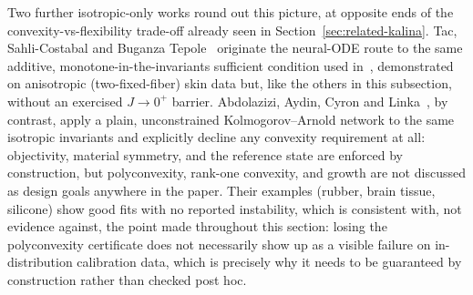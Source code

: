 \documentclass[10pt,a4paper]{article}
\begin{document}
Two further isotropic-only works round out this picture, at opposite ends
of the convexity-vs-flexibility trade-off already seen in
Section~\ref{sec:related-kalina}. Tac, Sahli-Costabal and Buganza
Tepole~\cite{Tac2022} originate the neural-ODE route to the same
additive, monotone-in-the-invariants sufficient condition used
in~\cite{Linka2023,Tac2023}, demonstrated on anisotropic (two-fixed-fiber)
skin data but, like the others in this subsection, without an exercised
$J\to0^+$ barrier. Abdolazizi, Aydin, Cyron and
Linka~\cite{Abdolazizi2025}, by contrast, apply a plain, unconstrained
Kolmogorov--Arnold network to the same isotropic invariants and explicitly
decline any convexity requirement at all: objectivity, material symmetry,
and the reference state are enforced by construction, but polyconvexity,
rank-one convexity, and growth are not discussed as design goals anywhere
in the paper. Their examples (rubber, brain tissue, silicone) show good
fits with no reported instability, which is consistent with, not evidence
against, the point made throughout this section: losing the polyconvexity
certificate does not necessarily show up as a visible failure on
in-distribution calibration data, which is precisely why it needs to be
guaranteed by construction rather than checked post hoc.
\end{document}
